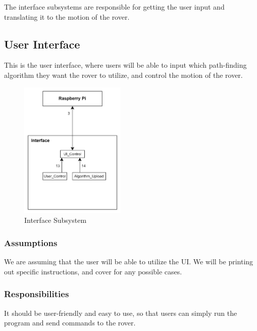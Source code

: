 The interface subsystems are responsible for getting the user input and translating it to the motion of the rover.

\subsection{User Interface}
This is the user interface, where users will be able to input which path-finding algorithm they want the rover to utilize, and control the motion of the rover.

\begin{figure}[h!]
	\centering
 	\includegraphics[width=0.45\textwidth]{images/interface/interface.jpg}
 \caption{Interface Subsystem} %
\end{figure}




\subsubsection{Assumptions}
We are assuming that the user will be able to utilize the UI. We will be printing out specific instructions, and cover for any possible cases.

\subsubsection{Responsibilities}
It should be user-friendly and easy to use, so that users can simply run the program and send commands to the rover.

